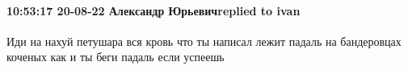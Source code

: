  
 
 
 
 

\paragraph{10:53:17 20-08-22 Александр Юрьевичreplied to ivan}

Иди на нахуй петушара вся кровь что ты написал лежит падаль на бандеровцах
коченых как и ты беги падаль если успеешь

